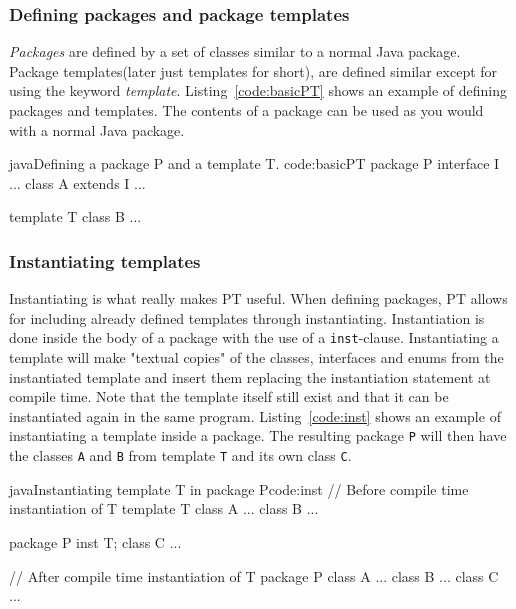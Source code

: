 \subsubsection{Defining packages and package templates}

\emph{Packages} are defined by a set of classes similar to a normal Java package.
Package templates(later just templates for short), are defined similar except for using the keyword \emph{template}.
Listing~\vref{code:basicPT} shows an example of defining packages and templates.
The contents of a package can be used as you would with a normal Java package.

\begin{code}{java}{Defining a package P and a template T. }{code:basicPT}
    package P {
        interface I { ... }
        class A extends I { ... }
    }

    template T {
        class B { ... }
    }
\end{code}

\subsubsection{Instantiating templates}\label{sec:inst}
Instantiating is what really makes PT useful.
When defining packages, PT allows for including already defined templates through instantiating.
Instantiation is done inside the body of a package with the use of a \verb|inst|-clause.
Instantiating a template will make "textual copies" of the  classes, interfaces and enums from the instantiated template and insert them replacing the instantiation statement at compile time.
Note that the template itself still exist and that it can be instantiated again in the same program.
Listing~\vref{code:inst} shows an example of instantiating a template inside a package.
The resulting package \verb|P| will then have the classes \verb|A| and \verb|B| from template \verb|T| and its own class \verb|C|.

\begin{code}{java}{Instantiating template T in package P}{code:inst}
// Before compile time instantiation of T
template T {
    class A { ... }
    class B { ... }
}

package P {
    inst T;
    class C { ... }
}

// After compile time instantiation of T
package P {
    class A { ... }
    class B { ... }
    class C { ... }
}
\end{code}

